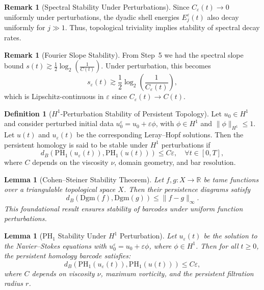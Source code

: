 \documentclass[11pt]{article}
\newtheorem{lemma}[theorem]{Lemma}
\theoremstyle{definition}
\newtheorem{definition}[theorem]{Definition}
\newtheorem{remark}[theorem]{Remark}
\begin{document}
\begin{remark}[Spectral Stability Under Perturbations]
Since $C_\varepsilon(t) \to 0$ uniformly under perturbations, the dyadic shell energies $E_j^\varepsilon(t)$ also decay uniformly for $j \gg 1$. Thus, topological triviality implies stability of spectral decay rates.
\end{remark}

\begin{remark}[Fourier Slope Stability]
From Step~5 we had the spectral slope bound $s(t) \gtrsim \frac{1}{2} \log_2 \left(\frac{1}{C(t)}\right)$. Under perturbation, this becomes
\[
s_\varepsilon(t) \gtrsim \frac{1}{2} \log_2 \left(\frac{1}{C_\varepsilon(t)}\right),
\]
which is Lipschitz-continuous in $\varepsilon$ since $C_\varepsilon(t) \to C(t)$.
\end{remark}

\begin{definition}[$H^1$-Perturbation Stability of Persistent Topology]
Let $u_0 \in H^1$ and consider perturbed initial data $u_0^\varepsilon = u_0 + \varepsilon \phi$, with $\phi \in H^1$ and $\|\phi\|_{H^1} \le 1$. Let $u(t)$ and $u_\varepsilon(t)$ be the corresponding Leray--Hopf solutions. Then the persistent homology is said to be stable under $H^1$ perturbations if
\[
d_B(\mathrm{PH}_1(u_\varepsilon(t)), \mathrm{PH}_1(u(t))) \le C \varepsilon, \quad \forall t \in [0, T],
\]
where $C$ depends on the viscosity $\nu$, domain geometry, and bar resolution.
\end{definition}

\begin{lemma}[Cohen--Steiner Stability Theorem]
Let $f, g : X \to \mathbb{R}$ be tame functions over a triangulable topological space $X$. Then their persistence diagrams satisfy
\[
d_B(\mathrm{Dgm}(f), \mathrm{Dgm}(g)) \le \|f - g\|_\infty.
\]
This foundational result ensures stability of barcodes under uniform function perturbations.
\end{lemma}

\begin{lemma}[PH$_1$ Stability Under $H^1$ Perturbation]
Let $u_\varepsilon(t)$ be the solution to the Navier--Stokes equations with $u_0^\varepsilon = u_0 + \varepsilon \phi$, where $\phi \in H^1$. Then for all $t \ge 0$, the persistent homology barcode satisfies:
\[
d_B(\mathrm{PH}_1(u_\varepsilon(t)), \mathrm{PH}_1(u(t))) \le C \varepsilon,
\]
where $C$ depends on viscosity $\nu$, maximum vorticity, and the persistent filtration radius $r$.
\end{lemma}
\end{document}
